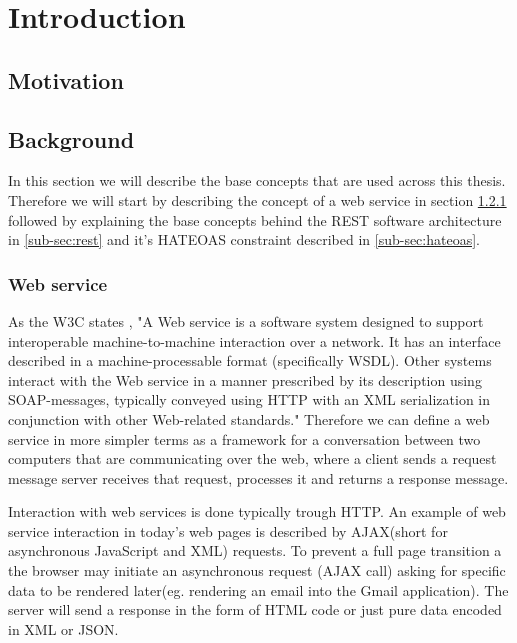 \chapter{Introduction}
\label{chapter:intro}

\section{Motivation}
\label{sec:motivation}


\section{Background}
\label{sec:background}

In this section we will describe the base concepts that are used across this thesis. Therefore we will start by describing the concept of a web service in section \ref{sub-sec:web-service} followed by explaining the base concepts behind the REST software architecture in \ref{sub-sec:rest} and it's HATEOAS constraint described in \ref{sub-sec:hateoas}.

\subsection{Web service}
\label{sub-sec:web-service}

As the W3C states \cite{W3C}, "A Web service is a software system designed to support interoperable machine-to-machine interaction over a network. It has an interface described in a machine-processable format (specifically WSDL). Other systems interact with the Web service in a manner prescribed by its description using SOAP-messages, typically conveyed using HTTP with an XML serialization in conjunction with other Web-related standards." Therefore we can define a web service in more simpler terms as a framework for a conversation between two computers that are communicating over the web, where a client sends a request message server receives that request, processes it and returns a response message.

Interaction with web services is done typically trough HTTP. An example of web service interaction in today's web pages is described by AJAX(short for  asynchronous JavaScript and XML) requests. 	To prevent a full page transition a the browser may initiate an asynchronous request (AJAX call) asking for specific data to be rendered later(eg. rendering an email into the Gmail application). The server will send a response in the form of HTML code or just pure data encoded in XML or JSON.

